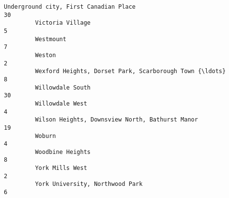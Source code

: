 \documentclass[11pt]{article}
\begin{document}
\begin{Verbatim}[commandchars=\\\{\}]
         Underground city, First Canadian Place                                  30   
         Victoria Village                                                         5   
         Westmount                                                                7   
         Weston                                                                   2   
         Wexford Heights, Dorset Park, Scarborough Town {\ldots}                       8   
         Willowdale South                                                        30   
         Willowdale West                                                          4   
         Wilson Heights, Downsview North, Bathurst Manor                         19   
         Woburn                                                                   4   
         Woodbine Heights                                                         8   
         York Mills West                                                          2   
         York University, Northwood Park                                          6   
         

\end{Verbatim}
\end{document}
